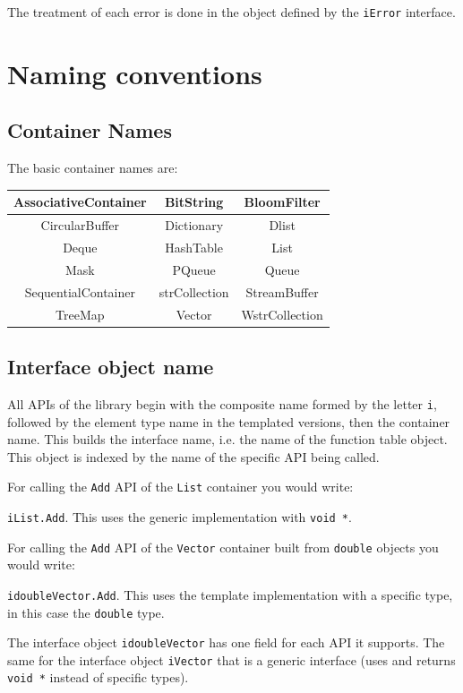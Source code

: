 \documentclass[12pt,a4paper]{memoir} %
\begin{document}
The treatment of each error is done in the object defined by the \texttt{iError} interface.

\section{Naming conventions}
\subsection{Container Names}
The basic container names are:
\begin{center}
\begin{tabular}{||c|c|c||}
\hline \hline
AssociativeContainer&BitString&BloomFilter\\\hline
CircularBuffer&Dictionary&Dlist\\\hline
Deque&HashTable&List\\\hline
Mask&PQueue&Queue\\\hline
SequentialContainer&strCollection&StreamBuffer\\\hline
TreeMap&Vector&WstrCollection\\\hline \hline
\end{tabular}
\end{center}
\subsection{Interface object name}
All APIs of the library begin with the composite name formed by the letter \verb,i,, followed by the element type name in the templated versions,
then the container name. This builds the interface name, i.e. the name of the function table object. This object is indexed by the name of the specific API being called. 

For calling the \verb,Add, API of the \verb,List, container you would write: \par
\verb,iList.Add,. This uses the generic implementation with \verb,void *,.

For calling the \verb,Add, API of the \verb,Vector, container built from \verb,double, objects you would write:
\par \verb,idoubleVector.Add,. This uses the template implementation with a specific type, in this case the \verb,double, type.

The interface object \verb,idoubleVector, has one field for each API it supports. The same for the interface object \verb,iVector, that is
a generic interface (uses and returns \verb,void *, instead of specific types). 
\end{document}

